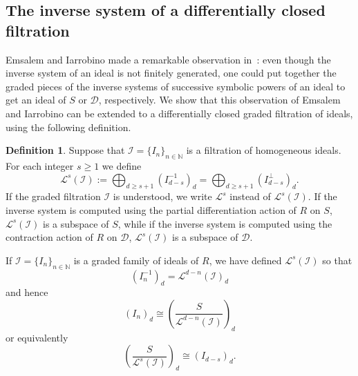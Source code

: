 \documentclass[12pt, reqno]{amsart}
\numberwithin{equation}{section}
\newcommand{\N}{{\mathbb N}}
\newcommand{\cI}{{\mathcal I}}
\newcommand{\I}{{\mathcal I}}
\renewcommand{\L}{{\mathcal L}}
\theoremstyle{plain} %
\theoremstyle{definition}
\newtheorem{defn}[thm]{Definition}
\theoremstyle{remark}
\renewcommand{\L}{\mathcal{L}}
\begin{document}
\subsection{The inverse system of a differentially closed filtration}

Emsalem and Iarrobino made a remarkable observation in~\cite{EI95}: even though the inverse system of an ideal is not finitely generated, one could put together the graded pieces of the inverse systems of successive symbolic powers of an ideal to get an ideal of $S$ or $\mathcal{D}$, respectively.  We show that this observation of Emsalem and Iarrobino can be extended to a differentially closed graded filtration of ideals, using the following definition.

\begin{defn}\label{def:LTransform}
Suppose that $\I=\{I_n\}_{n\in\N}$ is a filtration of homogeneous ideals.  For each integer $s\ge 1$ we define
\[
\L^s(\cI):=\bigoplus_{d\ge s+1} \left(I_{d-s}^{-1}\right)_d=\bigoplus_{d\ge s+1} \left(I_{d-s}^{\perp}\right)_d.
\]
If the graded filtration $\I$ is understood, we write $\L^s$ instead of $\L^s(\I)$.  If the inverse system is computed using the partial differentiation action of $R$ on $S$, $\L^s(\I)$ is a subspace of $S$, while if the inverse system is computed using the contraction action of $R$ on $\mathcal{D}$, $\L^s(\I)$ is a subspace of $\mathcal{D}$.
\end{defn}

If $\I=\{I_n\}_{n\in\N}$ is a graded family of ideals of $R$, we have defined $\L^s(\I)$ so that
\[
\left(I^{-1}_n\right)_d= \L^{d-n}(\I)_d
\]
and hence
\[
\left(I_n\right)_d\cong\left( \frac{S}{\L^{d-n}(\I)}\right)_d
\]
or equivalently
\begin{equation}
\label{eq:SmodLvsI}
\left( \frac{S}{\L^{s}(\I)}\right)_d\cong (I_{d-s})_d.
\end{equation}
\end{document}
